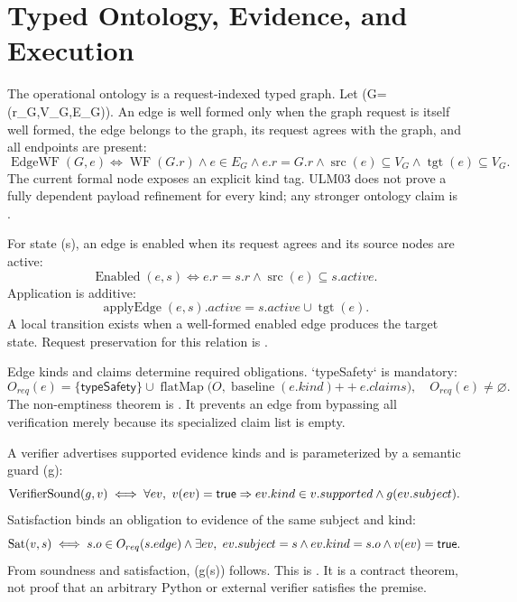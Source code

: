 \section{Typed Ontology, Evidence, and Execution}
\label{sec:ontology}

The operational ontology is a request-indexed typed graph. Let (G=(r_G,V_G,E_G)). An edge is well formed only when the graph request is itself well formed, the edge belongs to the graph, its request agrees with the graph, and all endpoints are present:
\begin{equation}
\operatorname{EdgeWF}(G,e)\iff
\operatorname{WF}(G.r)\land e\in E_G\land e.r=G.r
\land\operatorname{src}(e)\subseteq V_G
\land\operatorname{tgt}(e)\subseteq V_G.
\label{eq:edge-wf}
\end{equation}
The current formal node exposes an explicit kind tag. ULM03 does not prove a fully dependent payload refinement for every kind; any stronger ontology claim is \conjectured{}.

For state (s), an edge is enabled when its request agrees and its source nodes are active:
\begin{equation}
\operatorname{Enabled}(e,s)\iff e.r=s.r\land
\operatorname{src}(e)\subseteq s.active.
\label{eq:enabled}
\end{equation}
Application is additive:
\begin{equation}
\operatorname{applyEdge}(e,s).active=
s.active\cup\operatorname{tgt}(e).
\label{eq:apply-edge}
\end{equation}
A local transition exists when a well-formed enabled edge produces the target state. Request preservation for this relation is \formalized{}.

Edge kinds and claims determine required obligations. `typeSafety` is mandatory:
\begin{equation}
O_{req}(e)=\{\mathsf{typeSafety}\}\cup
\operatorname{flatMap}\bigl(O,
\operatorname{baseline}(e.kind)\mathbin{++}e.claims\bigr),
\quad O_{req}(e)\neq\varnothing.
\label{eq:required-obligations}
\end{equation}
The non-emptiness theorem is \formalized{}. It prevents an edge from bypassing all verification merely because its specialized claim list is empty.

A verifier advertises supported evidence kinds and is parameterized by a semantic guard (g):
\begin{equation}
\operatorname{VerifierSound}(g,v)\iff
\forall ev,\ v(ev)=\mathsf{true}\Rightarrow
ev.kind\in v.supported\land g(ev.subject).
\label{eq:verifier-sound}
\end{equation}
Satisfaction binds an obligation to evidence of the same subject and kind:
\begin{equation}
\operatorname{Sat}(v,s)\iff
s.o\in O_{req}(s.edge)\land
\exists ev,\ ev.subject=s\land ev.kind=s.o\land v(ev)=\mathsf{true}.
\label{eq:sat}
\end{equation}
From soundness and satisfaction, (g(s)) follows. This is \formalized{}. It is a contract theorem, not proof that an arbitrary Python or external verifier satisfies the premise.

